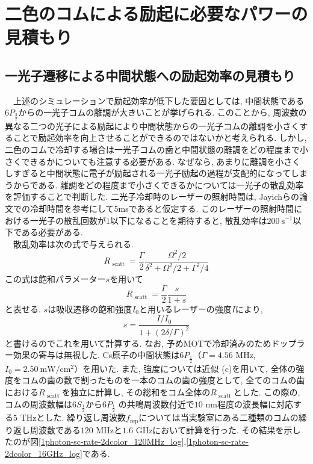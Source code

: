 \documentclass[uplatex, dvipdfmx, a4paper, report, papersize, 11pt]{jsbook}
\begin{document}
\section{二色のコムによる励起に必要なパワーの見積もり}
\subsection{一光子遷移による中間状態への励起効率の見積もり}
　上述のシミュレーションで励起効率が低下した要因としては, 中間状態である$6P_{\frac{3}{2}}$からの一光子コムの離調が大きいことが挙げられる. このことから, 周波数の異なる二つの光子による励起により中間状態からの一光子コムの離調を小さくすることで励起効率を向上させることができるのではないかと考えられる. しかし, 二色のコムで冷却する場合は一光子コムの歯と中間状態の離調をどの程度まで小さくできるかについても注意する必要がある. なぜなら, あまりに離調を小さくしすぎると中間状態に電子が励起される一光子励起の過程が支配的になってしまうからである. 離調をどの程度まで小さくできるかについては一光子の散乱効率を評価することで判断した. 二光子冷却時のレーザーの照射時間は, Jayichらの論文での冷却時間を参考にして5msであると仮定する. このレーザーの照射時間における一光子の散乱回数が$1$以下になることを期待すると, 散乱効率は$200\ \mathrm{s^{-1}}$以下である必要がある. \\
　散乱効率は次の式で与えられる.
\begin{equation}
  R _ { \text { scatt } } = \frac { \Gamma } { 2 } \frac { \Omega ^ { 2 } / 2 } { \delta ^ { 2 } + \Omega ^ { 2 } / 2 + \Gamma ^ { 2 } / 4 }
\end{equation}
この式は飽和パラメーター$s$を用いて
\begin{equation}
  R _ { \text { scatt } } = \frac { \Gamma } { 2 } \frac{s}{1+s}
\end{equation}
と表せる. $s$は吸収遷移の飽和強度$I_0$と用いるレーザーの強度$I$により,
\begin{equation}
  s = \frac{I/I_0}{1+(2\delta/\Gamma)^2}
\end{equation}
と書けるのでこれを用いて計算する\cite{ノーベル賞と分光学}. なお, 予めMOTで冷却済みのためドップラー効果の寄与は無視した. Cs原子の中間状態は$6P_{\frac{1}{2}}$（$\Gamma = 4.56$ MHz,\ $I_0 = 2.50 \mathrm{\ mW/cm^2}$）を用いた\cite{CsDLine}. また, 強度については近似 (c)を用いて, 全体の強度をコムの歯の数で割ったものを一本のコムの歯の強度として, 全てのコムの歯における$R _ { \text { scatt } }$を独立に計算し, その総和をコム全体の$R _ { \text { scatt } }$とした. この際の, コムの周波数幅は$6S_{\frac{1}{2}}$から$6P_{\frac{1}{2}}$
の共鳴周波数付近で$10$ nm程度の波長幅に対応する$5$ THzとした. 繰り返し周波数$f_{\mathrm{rep}}$については当実験室にある二種類のコムの繰り返し周波数である$120$ MHzと$1.6$ GHzにおいて計算を行った. その結果を示したのが図\ref{1photon-sc-rate-2dcolor_120MHz_log},\ref{1photon-sc-rate-2dcolor_16GHz_log}である. \\
\end{document}
